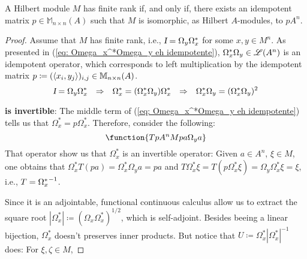 \begin{teorema}\label{teo: M rank finito sse M = pA^n}
A Hilbert module $M$ has finite rank if, and only if, there exists an idempotent matrix $p\in \mathbb M_{n\times n}(A)$ such that $M$ is isomorphic, as Hilbert $A$-modules, to $p A^{n}$.
\begin{proof}
Assume that $M$ has finite rank, i.e., $\textsl{I} = \Omega_y\Omega_x^*$ for some $x,y \in M^n$. As presented in (\ref{eq: Omega_x^*Omega_y eh idempotente}), $\Omega_x^*\Omega_y \in \mathscr L(A^n)$ is an idempotent operator, which corresponds to left multiplication by the idempotent matrix $p\coloneqq (\langle {x_i},{y_j}\rangle)_{i,j} \in \mathbb M_{n\times n}(A)$.
\begin{equation}
\label{eq: Omega_x^*Omega_y eh idempotente}
    \textsl{I} = \Omega_y \Omega_x^* \hspace{0.25cm} \Rightarrow \hspace{0.25cm} \Omega_x^* = (\Omega_x^*\Omega_y) \Omega_x^* \hspace{0.25cm} \Rightarrow \hspace{0.25cm} \Omega_x^*\Omega_y = (\Omega_x^*\Omega_y)^2
\end{equation}
\begin{itroman}
    \item[]  \textbf{is invertible}: The middle term of (\ref{eq: Omega_x^*Omega_y eh idempotente}) tells us that $\Omega_x^*= p\Omega_x^* $. Therefore, consider the following:
\begin{equation*}
    \function{T{pA^n}{M}{pa}{\Omega_ya}}
\end{equation*}
That operator show us that $\Omega_x^*$ is an invertible operator: Given $a\in A^n$, $\xi \in M$,  one obtains that $\Omega_x^* T(pa) = \Omega_x^*\Omega_ya = pa$ and $T\Omega_x^* \xi = T(p\Omega_x^*\xi) = \Omega_y\Omega_x^*\xi = \xi$, i.e., $T = {\Omega_x^*}^{-1}$.
\end{itroman}
Since it is an adjointable, functional continuous calculus allow us to extract the square root $|\Omega_x^*| \coloneqq (\Omega_x\Omega_x^*)^{1/2}$, which is self-adjoint. Besides beeing a linear bijection, $\Omega_x^*$ doesn't preserves inner products. But notice that $U \coloneqq \Omega_x^*|\Omega_x^*|^{-1}$ does: For $\xi,\zeta \in M$,

\end{proof}
\end{teorema}
